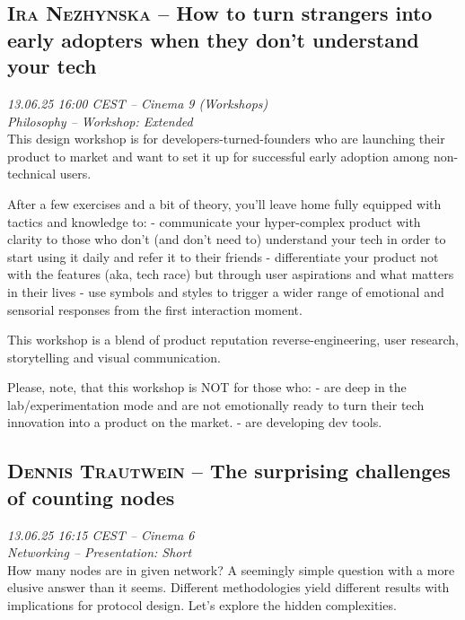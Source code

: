 \clearpage
\subsection {\textsc{Ira Nezhynska}  -- How to turn strangers into early adopters when they don't understand your tech} \noindent \textit {13.06.25 16:00 CEST -- Cinema 9 (Workshops)\\ Philosophy -- Workshop: Extended}\\[1em] This design workshop is for developers-turned-founders who are launching their product to market and want to set it up for successful early adoption among non-technical users.

After a few exercises and a bit of theory, you'll leave home fully equipped with tactics and knowledge to: 
- communicate your hyper-complex product with clarity to those who don't (and don't need to) understand your tech in order to start using it daily and refer it to their friends 
- differentiate your product not with the features (aka, tech race) but through user aspirations and what matters in their lives
- use symbols and styles to trigger a wider range of emotional and sensorial responses from the first interaction moment.

This workshop is a blend of product reputation reverse-engineering, user research, storytelling and visual communication.

Please, note, that this workshop is NOT for those who:
- are deep in the lab/experimentation mode and are not emotionally ready to turn their tech innovation into a product on the market.
- are developing dev tools.

\clearpage
\subsection {\textsc{Dennis Trautwein}  -- The surprising challenges of counting nodes} \noindent \textit {13.06.25 16:15 CEST -- Cinema 6\\ Networking -- Presentation: Short}\\[1em] How many nodes are in given network? A seemingly simple question with a more elusive answer than it seems. Different methodologies yield different results with implications for protocol design. Let's explore the hidden complexities.

\clearpage
